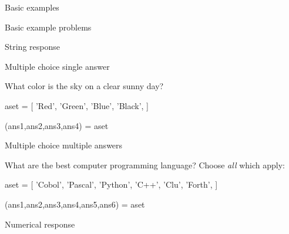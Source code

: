 \begin{edXchapter}{Basic examples}
\begin{edXsection}{Basic example problems}
\begin{edXvertical}
\begin{edXproblem}{String response}
\end{edXproblem}


\end{edXvertical}


\begin{edXvertical}


\begin{edXproblem}{Multiple choice single answer}{}

What color is the sky on a clear sunny day?

\begin{edXscript}

aset = [ 'Red',
         'Green',
         'Blue',
         'Black',
      ]

(ans1,ans2,ans3,ans4) = aset

\end{edXscript}


\end{edXproblem}


\begin{edXproblem}{Multiple choice multiple answers}{}

What are the best computer programming language?  Choose {\em all} which apply:

\begin{edXscript}

aset = [ 'Cobol',
         'Pascal',
         'Python',
         'C++',
         'Clu',
         'Forth',
      ]

(ans1,ans2,ans3,ans4,ans5,ans6) = aset

\end{edXscript}


\end{edXproblem}

\end{edXvertical}


\begin{edXvertical}


\begin{edXproblem}{Numerical response}


\end{edXproblem}
\end{edXvertical}
\end{edXsection}
\end{edXchapter}
